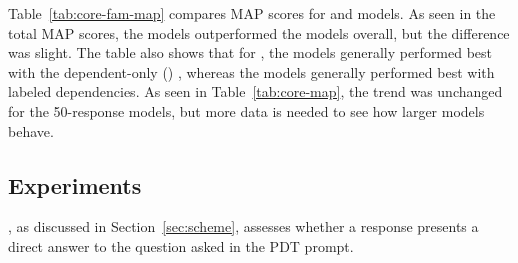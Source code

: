 Table~\ref{tab:core-fam-map} compares  MAP scores for  and  models. As seen in the total MAP scores, the  models outperformed the  models overall, but the difference was slight. The table also shows that for , the  models generally performed best with the dependent-only () , whereas the  models generally performed best with labeled dependencies. As seen in Table~\ref{tab:core-map}, the trend was unchanged for the  50-response models, but more data is needed to see how larger  models behave.



\subsection{ Experiments}
\label{sec:map-answer}

, as discussed in Section~\ref{sec:scheme}, assesses whether a response presents a direct answer to the question asked in the PDT prompt.

